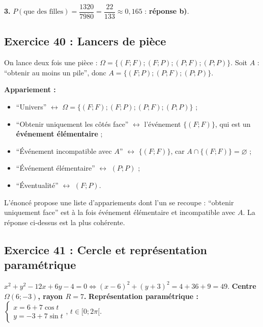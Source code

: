 \textbf{3.} $P(\text{que des filles})=\dfrac{1320}{7980}=\dfrac{22}{133}\approx0{,}165$ : \textbf{r\'eponse b)}.

\subsection{Exercice 40 : Lancers de pi\`ece}

On lance deux fois une pi\`ece : $\Omega=\{(F;F);(F;P);(P;F);(P;P)\}$. Soit $A$ : ``obtenir au moins un pile'',
donc $A=\{(F;P);(P;F);(P;P)\}$.

\textbf{Appariement :}
\begin{itemize}
  \item ``Univers'' $\longleftrightarrow$ $\Omega=\{(F;F);(F;P);(P;F);(P;P)\}$ ;
  \item ``Obtenir uniquement les c\^ot\'es face'' $\longleftrightarrow$ l'\'ev\'enement $\{(F;F)\}$, qui est un \textbf{\'ev\'enement \'el\'ementaire} ;
  \item ``\'Ev\'enement incompatible avec $A$'' $\longleftrightarrow$ $\{(F;F)\}$, car $A\cap\{(F;F)\}=\varnothing$ ;
  \item ``\'Ev\'enement \'el\'ementaire'' $\longleftrightarrow$ $(P;P)$ ;
  \item ``\'Eventualit\'e'' $\longleftrightarrow$ $(F;P)$.
\end{itemize}
\begin{rem} L'\'enonc\'e propose une liste d'appariements dont l'un se recoupe : ``obtenir uniquement face'' est \`a la fois
\'ev\'enement \'el\'ementaire et incompatible avec $A$. La r\'eponse ci-dessus est la plus coh\'erente.\end{rem}

\subsection{Exercice 41 : Cercle et repr\'esentation param\'etrique}

$x^2+y^2-12x+6y-4=0\iff(x-6)^2+(y+3)^2=4+36+9=49$.
\textbf{Centre $\Omega(6;-3)$, rayon $R=7$.}
\textbf{Repr\'esentation param\'etrique :} $\begin{cases}x=6+7\cos t\\ y=-3+7\sin t\end{cases}$, $t\in[0;2\pi[$.

